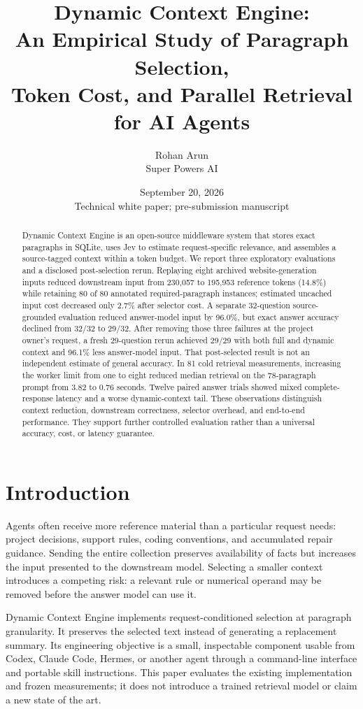 \documentclass[11pt]{article}
\title{Dynamic Context Engine:\\An Empirical Study of Paragraph Selection,\\Token Cost, and Parallel Retrieval for AI Agents}
\author{Rohan Arun\\Super Powers AI}
\date{September 20, 2026\\\small Technical white paper; pre-submission manuscript}
\begin{document}
\maketitle
\begin{abstract}
Dynamic Context Engine is an open-source middleware system that stores exact paragraphs in SQLite, uses Jev to estimate request-specific relevance, and assembles a source-tagged context within a token budget. We report three exploratory evaluations and a disclosed post-selection rerun. Replaying eight archived website-generation inputs reduced downstream input from 230,057 to 195,953 reference tokens (14.8\%) while retaining 80 of 80 annotated required-paragraph instances; estimated uncached input cost decreased only 2.7\% after selector cost. A separate 32-question source-grounded evaluation reduced answer-model input by 96.0\%, but exact answer accuracy declined from 32/32 to 29/32. After removing those three failures at the project owner's request, a fresh 29-question rerun achieved 29/29 with both full and dynamic context and 96.1\% less answer-model input. That post-selected result is not an independent estimate of general accuracy. In 81 cold retrieval measurements, increasing the worker limit from one to eight reduced median retrieval on the 78-paragraph prompt from 3.82 to 0.76 seconds. Twelve paired answer trials showed mixed complete-response latency and a worse dynamic-context tail. These observations distinguish context reduction, downstream correctness, selector overhead, and end-to-end performance. They support further controlled evaluation rather than a universal accuracy, cost, or latency guarantee.
\end{abstract}

\section{Introduction}
Agents often receive more reference material than a particular request needs: project decisions, support rules, coding conventions, and accumulated repair guidance. Sending the entire collection preserves availability of facts but increases the input presented to the downstream model. Selecting a smaller context introduces a competing risk: a relevant rule or numerical operand may be removed before the answer model can use it.

Dynamic Context Engine implements request-conditioned selection at paragraph granularity. It preserves the selected text instead of generating a replacement summary. Its engineering objective is a small, inspectable component usable from Codex, Claude Code, Hermes, or another agent through a command-line interface and portable skill instructions. This paper evaluates the existing implementation and frozen measurements; it does not introduce a trained retrieval model or claim a new state of the art.
\end{document}
